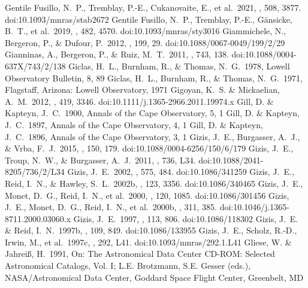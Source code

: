 \documentclass[twocolumn,tighten,twocolappendix]{aastex631}
\begin{document}
\begin{thebibliography}{}
 Gentile Fusillo, N.~P., Tremblay, P.-E., Cukanovaite, E., et al.\ 2021, \mnras, 508, 3877. doi:10.1093/mnras/stab2672
 Gentile Fusillo, N.~P., Tremblay, P.-E., G{\"a}nsicke, B.~T., et al.\ 2019, \mnras, 482, 4570. doi:10.1093/mnras/sty3016
 Giammichele, N., Bergeron, P., \& Dufour, P.\ 2012, \apjs, 199, 29. doi:10.1088/0067-0049/199/2/29
 Gianninas, A., Bergeron, P., \& Ruiz, M.~T.\ 2011, \apj, 743, 138. doi:10.1088/0004-637X/743/2/138
 Giclas, H.~L., Burnham, R., \& Thomas, N.~G.\ 1978, Lowell Observatory Bulletin, 8, 89
 Giclas, H.~L., Burnham, R., \& Thomas, N.~G.\ 1971, Flagstaff, Arizona: Lowell Observatory, 1971
 Gigoyan, K.~S. \& Mickaelian, A.~M.\ 2012, \mnras, 419, 3346. doi:10.1111/j.1365-2966.2011.19974.x
 Gill, D. \& Kapteyn, J.~C.\ 1900, Annals of the Cape Observatory, 5, 1
 Gill, D. \& Kapteyn, J.~C.\ 1897, Annals of the Cape Observatory, 4, 1
 Gill, D. \& Kapteyn, J.~C.\ 1896, Annals of the Cape Observatory, 3, 1
 Gizis, J.~E., Burgasser, A.~J., \& Vrba, F.~J.\ 2015, \aj, 150, 179. doi:10.1088/0004-6256/150/6/179
 Gizis, J.~E., Troup, N.~W., \& Burgasser, A.~J.\ 2011, \apjl, 736, L34. doi:10.1088/2041-8205/736/2/L34
 Gizis, J.~E.\ 2002, \apj, 575, 484. doi:10.1086/341259
 Gizis, J.~E., Reid, I.~N., \& Hawley, S.~L.\ 2002b, \aj, 123, 3356. doi:10.1086/340465
 Gizis, J.~E., Monet, D.~G., Reid, I.~N., et al.\ 2000, \aj, 120, 1085. doi:10.1086/301456
 Gizis, J.~E., Monet, D.~G., Reid, I.~N., et al.\ 2000b, \mnras, 311, 385. doi:10.1046/j.1365-8711.2000.03060.x
 Gizis, J.~E.\ 1997, \aj, 113, 806. doi:10.1086/118302
 Gizis, J.~E. \& Reid, I.~N.\ 1997b, \pasp, 109, 849. doi:10.1086/133955
 Gizis, J.~E., Scholz, R.-D., Irwin, M., et al.\ 1997c, \mnras, 292, L41. doi:10.1093/mnras/292.1.L41
 Gliese, W. \& Jahrei{\ss}, H.\ 1991, On: The Astronomical Data Center CD-ROM: Selected Astronomical Catalogs, Vol. I; L.E. Brotzmann, S.E. Gesser (eds.), NASA/Astronomical Data Center, Goddard Space Flight Center, Greenbelt, MD

\end{thebibliography}
\end{document}
